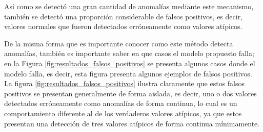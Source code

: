 As\'{i} como se detect\'{o} una gran cantidad de anomal\'{i}as mediante este mecanismo, tambi\'{e}n se detect\'{o} una proporci\'{o}n considerable de falsos positivos, es decir, valores normales que fueron detectados err\'{o}neamente como valores at\'{i}picos.

\vspace{5mm} %

De la misma forma que es importante conocer como este m\'{e}todo detecta anomal\'{i}as, tambi\'{e}n es importante saber en que casos el modelo propuesto falla; en la Figura \ref{fig:resultados_falsos_positivos} se presenta algunos casos donde el modelo falla, es decir, esta figura presenta algunos ejemplos de falsos positivos. La figura \ref{fig:resultados_falsos_positivos} ilustra claramente que estos falsos positivos se presentan generalmente de forma aislada, es decir, uno o dos valores detectados err\'{o}neamente como anomal\'{i}as de forma continua, lo cual es un comportamiento diferente al de los verdaderos valores at\'{i}picos, ya que estos presentan una detecci\'{o}n de tres valores at\'{i}picos de forma continua m\'{i}nimamente.

